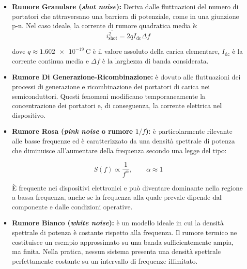 ﻿\documentclass[11pt, a4paper]{article}
\begin{document}
\begin{enumerate}
\begin{itemize}
        \item \textbf{Rumore Granulare (\textit{shot noise}):} Deriva dalle fluttuazioni del numero di portatori che attraversano una barriera di potenziale, come in una giunzione p-n. Nel caso ideale, la corrente di rumore quadratica media è:
        \[
            \overline{i_{\text{shot}}^2} = 2 q I_{\text{dc}} \Delta f
        \]

        dove $q \approx \SI{1.602e-19}{\coulomb}$ è il valore assoluto della carica elementare, $I_{\text{dc}}$ è la corrente continua media e $\Delta f$ è la larghezza di banda considerata.

        \item \textbf{Rumore Di Generazione-Ricombinazione:} è dovuto alle fluttuazioni dei processi di generazione e ricombinazione dei portatori di carica nei semiconduttori. Questi fenomeni modificano temporaneamente la concentrazione dei portatori e, di conseguenza, la corrente elettrica nel dispositivo.

        \item \textbf{Rumore Rosa (\textit{pink noise} o rumore $1/f$):} è particolarmente rilevante alle basse frequenze ed è caratterizzato da una densità spettrale di potenza che diminuisce all'aumentare della frequenza secondo una legge del tipo:

        \[
            S(f) \propto \frac{1}{f^\alpha},
            \qquad \alpha \approx 1
        \]

        È frequente nei dispositivi elettronici e può diventare dominante nella regione a bassa frequenza, anche se la frequenza alla quale prevale dipende dal componente e dalle condizioni operative.

        \item \textbf{Rumore Bianco (\textit{white noise}):} è un modello ideale in cui la densità spettrale di potenza è costante rispetto alla frequenza. Il rumore termico ne costituisce un esempio approssimato su una banda sufficientemente ampia, ma finita. Nella pratica, nessun sistema presenta una densità spettrale perfettamente costante su un intervallo di frequenze illimitato.
    \end{itemize}
\end{enumerate}

\newpage
\end{document}
